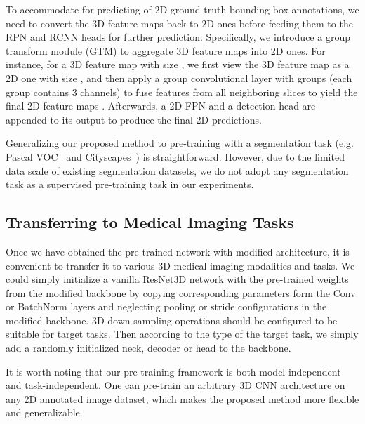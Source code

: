 \documentclass[journal,twoside,web]{ieeecolor}
\begin{document}
To accommodate for predicting of 2D ground-truth bounding box annotations, we need to convert the 3D feature maps back to 2D ones before feeding them to the RPN and RCNN heads for further prediction. Specifically, we introduce a group transform module (GTM) to aggregate 3D feature maps into 2D ones. For instance, for a 3D feature map with size , we first view the 3D feature map as a 2D one with size , and then apply a group convolutional layer with  groups (each group contains 3 channels) to fuse features from all neighboring slices to yield the final 2D feature maps . 
Afterwards, a 2D FPN and a detection head are appended to its output to produce the final 2D predictions.




Generalizing our proposed method to pre-training with a segmentation task (e.g. Pascal VOC~\cite{everingham2015pascal} and Cityscapes~\cite{cordts2016cityscapes}) is straightforward. However, due to the limited data scale of existing segmentation datasets, we do not adopt any segmentation task as a supervised pre-training task in our experiments.


\subsection{Transferring to Medical Imaging Tasks}
\label{trans}

Once we have obtained the pre-trained network with modified architecture, it is convenient to transfer it to various 3D medical imaging modalities and tasks. We could simply initialize a vanilla ResNet3D network with the pre-trained weights from the modified backbone by copying corresponding parameters form the Conv or BatchNorm layers and neglecting pooling or stride configurations in the modified backbone. 3D down-sampling operations should be configured to be suitable for target tasks. Then according to the type of the target task, we simply add a randomly initialized neck, decoder or head to the backbone. 

It is worth noting that our pre-training framework is both model-independent and task-independent. One can pre-train an arbitrary 3D CNN architecture on any 2D annotated image dataset, which makes the proposed method more flexible and generalizable.
\end{document}
